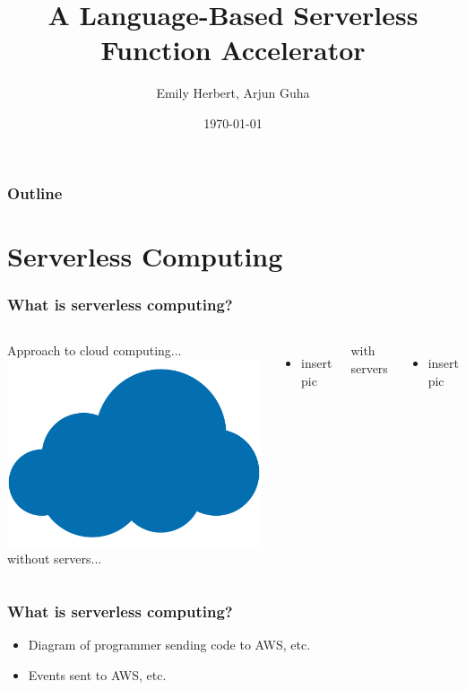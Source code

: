 \documentclass{beamer}
\title{A Language-Based Serverless Function Accelerator}
\author{Emily Herbert, Arjun Guha}
\institute{University of Massachusetts Amherst}
\date{\today}
\begin{document}
\begin{frame}
\titlepage
\end{frame}

\begin{frame}
\frametitle{Outline}
\tableofcontents
\end{frame}

\section{Serverless Computing}
\frame{\tableofcontents[currentsection]}

\begin{frame}
\frametitle{What is serverless computing?}
\begin{columns}
Approach to cloud computing...
\includegraphics[scale=0.15]{images/cloud.png}
without servers...
\begin{itemize}
    \item insert pic
\end{itemize}
with servers
\begin{itemize}
    \item insert pic
\end{itemize}
\end{columns}
\end{frame}

\begin{frame}
\frametitle{What is serverless computing?}
\begin{itemize}
  \item Diagram of programmer sending code to AWS, etc.
  \item Events sent to AWS, etc.
\end{itemize}
\end{frame}
\end{document}
